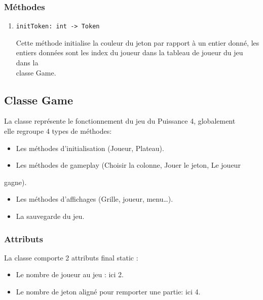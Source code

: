 \documentclass[11pt]{article}
\begin{document}
\subsubsection{Méthodes}
\label{sec:org888e352}
\begin{enumerate}
\item \texttt{initToken: int -> Token}
\label{sec:org14a98d5}

Cette méthode initialise la couleur du jeton par rapport à un entier donné, les\\
entiers données sont les index du joueur dans la tableau de joueur du jeu dans la\\
classe Game.\\
\end{enumerate}

\subsection{Classe Game\label{org1b782a5}}
\label{sec:org0c20cf2}

La classe représente le fonctionnement du jeu du Puissance 4, globalement\\
elle regroupe 4 types de méthodes:\\
\begin{itemize}
\item Les méthodes d'initialisation (Joueur, Plateau).\\
\item Les méthodes de gameplay (Choisir la colonne, Jouer le jeton, Le joueur\\
\end{itemize}
gagne).\\
\begin{itemize}
\item Les méthodes d'affichages (Grille, joueur, menu\ldots{}).\\
\item La sauvegarde du jeu.\\
\end{itemize}

\subsubsection{Attributs}
\label{sec:orga7bad58}

La classe comporte 2 attributs final static :\\
\begin{itemize}
\item Le nombre de joueur au jeu : ici 2.\\
\item Le nombre de jeton aligné pour remporter une partie: ici 4.\\
\end{itemize}
\end{document}
